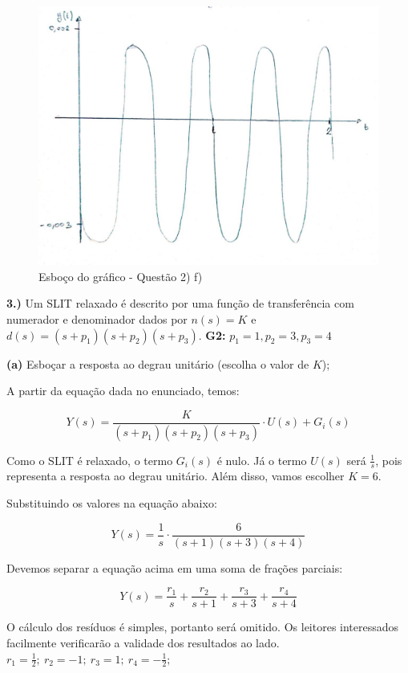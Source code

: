\documentclass{article}
\begin{document}
\begin{figure}[h]
    \includegraphics[scale=0.25]{plot2f}
    \centering
    \caption{Esboço do gráfico - Questão 2) f)}
\end{figure}

\vspace{\baselineskip}

\textbf{3.)} Um SLIT relaxado é descrito por uma função de transferência com numerador e denominador dados por $n(s) = K$ e $d(s) = (s + p_1)(s + p_2)(s + p_3)$.
\textbf{G2:} $p_1 = 1, p_2 = 3, p_3 = 4$

\textbf{(a)} Esboçar a resposta ao degrau unitário (escolha o valor de $K$);

A partir da equação dada no enunciado, temos:

\[ Y(s) = \frac{K}{(s+p_{1})(s+p_{2})(s+p_{3})} \cdot U(s) + G_{i}(s) \]

\vspace{\baselineskip}

Como o SLIT é relaxado, o termo $ G_{i}(s) $ é nulo.
Já o termo $ U(s) $ será $ \frac{1}{s} $, pois representa a resposta ao degrau unitário.
Além disso, vamos escolher $ K = 6 $.

Substituindo os valores na equação abaixo:

\[ Y(s) = \frac{1}{s} \cdot \frac{6}{(s+1)(s+3)(s+4)} \]

Devemos separar a equação acima em uma soma de frações parciais:

\[ Y(s) = \frac{r_1}{s} + \frac{r_2}{s+1} + \frac{r_3}{s+3} + \frac{r_4}{s+4} \]

O cálculo dos resíduos é simples, portanto será omitido. Os leitores interessados
facilmente verificarão a validade dos resultados ao lado. $ r_1 = \frac{1}{2}; \ r_2 = -1; \ r_3 = 1; \ r_4 = - \frac{1}{2}; $
\end{document}
